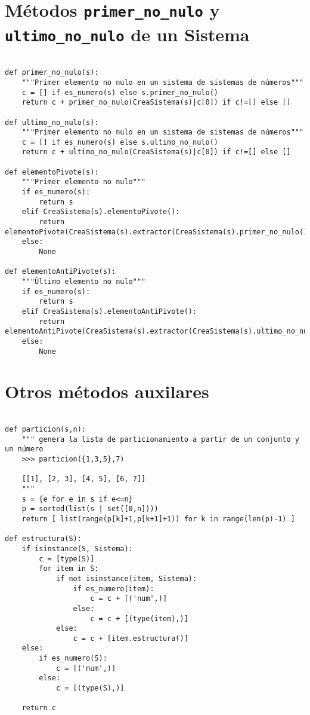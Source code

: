 \documentclass[11pt]{report}
\begin{document}
\section{Métodos \texttt{primer\_no\_nulo} y \texttt{ultimo\_no\_nulo} de un Sistema}
\label{sec:orgf17f372}

\begin{verbatim}

def primer_no_nulo(s):
    """Primer elemento no nulo en un sistema de sistemas de números"""
    c = [] if es_numero(s) else s.primer_no_nulo()
    return c + primer_no_nulo(CreaSistema(s)|c[0]) if c!=[] else []

def ultimo_no_nulo(s):
    """Primer elemento no nulo en un sistema de sistemas de números"""
    c = [] if es_numero(s) else s.ultimo_no_nulo()
    return c + ultimo_no_nulo(CreaSistema(s)|c[0]) if c!=[] else []

def elementoPivote(s):
    """Primer elemento no nulo"""
    if es_numero(s):
        return s
    elif CreaSistema(s).elementoPivote():
        return elementoPivote(CreaSistema(s).extractor(CreaSistema(s).primer_no_nulo()))
    else:
        None

def elementoAntiPivote(s):
    """Último elemento no nulo"""
    if es_numero(s):
        return s
    elif CreaSistema(s).elementoAntiPivote():
        return elementoAntiPivote(CreaSistema(s).extractor(CreaSistema(s).ultimo_no_nulo()))
    else:
        None

\end{verbatim}

\section{Otros métodos auxilares}
\label{sec:orge73bfa5}
\begin{verbatim}

def particion(s,n):
    """ genera la lista de particionamiento a partir de un conjunto y un número
    >>> particion({1,3,5},7)

    [[1], [2, 3], [4, 5], [6, 7]]
    """
    s = {e for e in s if e<=n}
    p = sorted(list(s | set([0,n])))
    return [ list(range(p[k]+1,p[k+1]+1)) for k in range(len(p)-1) ]
    
def estructura(S):
    if isinstance(S, Sistema):
        c = [type(S)]
        for item in S:
            if not isinstance(item, Sistema):
                if es_numero(item):
                    c = c + [('num',)]
                else:
                    c = c + [(type(item),)]
            else:
                c = c + [item.estructura()]
    else:
        if es_numero(S):
            c = [('num',)]
        else:
            c = [(type(S),)]

    return c

\end{verbatim}
\end{document}
